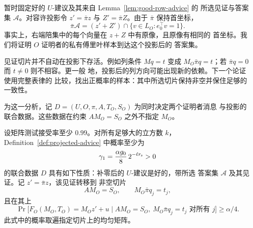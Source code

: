暂时固定好的 $U$-建议及其来自 Lemma~\ref{lem:good-row-advice} 的
所选见证与答案集 $\mathcal A$。对容许投影令 $z'=\bar\pi z$ 与
$Z'=\bar\pi Z$。由于 $\bar\pi$ 保持首坐标，
\begin{equation}
 \bar\pi\mathcal A
 =(z'+Z')\cap\{v\in L_O:e_0^\top v=1\}.
 \label{eq:projected-answer-set}
\end{equation}
事实上，右端陪集中的每个向量在 $z+Z$ 中有原像，且原像有相同的
首坐标。我们将证明 $O$ 证明者的私有傅里叶样本到达这个投影后的
答案集。

见证切片并不自动在投影下存活。例如列条件 $Mq=t$ 变成
$M_O\bar\pi q=t$；若 $\bar\pi q=0$ 而 $t\ne0$ 则不相容。更一般
地，投影后的列方向可能出现新的依赖。下一个论证使用完整表律的
比较，找出正概率的样本：其中所选切片保持非空并保住足够的一致性。

为这一分析，记 $D=(U,O,\pi,A,T_O,S_O)$ 为同时决定两个证明者消息
与投影的联合数据。这些数据在约束 $AM_O=S_O$ 之外不指定 $M_O$。

\begin{lemma}[所选见证的转移]
\label{lem:projected-witness}
设矩阵测试接受率至少 $0.99$。对所有足够大的立方数 $k$，
Definition~\ref{def:projected-advice} 中概率至少为
\begin{equation}
 \gamma_1=\frac{\alpha g_0}{8}\,2^{-\ell r_{\rm s}}>0
 \label{eq:projected-witness-mass}
\end{equation}
的联合数据 $D$ 具有如下性质：补零后的 $U$-建议是好的，带所选
答案集 $\mathcal A$ 及其见证。记 $z'=\bar\pi z$，该见证转移到
非空切片
\[
 AM_O=S_O,\qquad M_O\bar\pi q_j=t_j,
\]
且在其上
\begin{equation}
 \Pr\bigl[F_O(M_O,T_O)=M_Oz'+u\mid
           AM_O=S_O,\ M_O\bar\pi q_j=t_j\text{ 对所有 }j\bigr]
 \ge\alpha/4.
 \label{eq:transferred-witness}
\end{equation}
此式中的概率取遍指定切片上的均匀矩阵。
\end{lemma}

